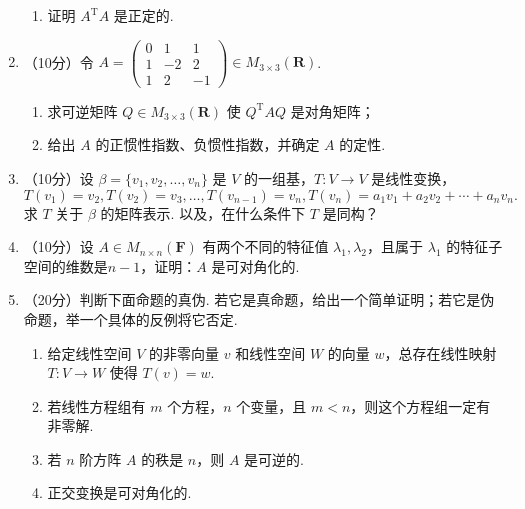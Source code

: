 \begin{enumerate}
\begin{enumerate}
        \item 证明 $A^{\mathrm{T}}A$ 是正定的.
    \end{enumerate}

    \item （10分）令 $A = \begin{pmatrix}0 & 1 & 1 \\ 1 & -2 & 2 \\ 1 & 2 & -1 \end{pmatrix} \in M_{3\times 3}(\mathbf R)$.
    \begin{enumerate}
        \item 求可逆矩阵 $Q\in M_{3\times 3}(\mathbf R)$ 使 $Q^{\mathrm{T}}AQ$ 是对角矩阵；

        \item 给出 $A$ 的正惯性指数、负惯性指数，并确定 $A$ 的定性.
    \end{enumerate}

    \item （10分）设 $\beta=\{v_1,v_2,\ldots,v_n\}$ 是 $V$ 的一组基，$T\colon V\to V$ 是线性变换，
    \[ T(v_1)=v_2,T(v_2)=v_3,\ldots,T(v_{n-1})=v_n,T(v_n)=a_1v_1+a_2v_2+\cdots+a_nv_n.\]
    求 $T$ 关于 $\beta$ 的矩阵表示. 以及，在什么条件下 $T$ 是同构？

    \item （10分）设 $A\in M_{n\times n}(\mathbf{F})$ 有两个不同的特征值 $\lambda_1,\lambda_2$，且属于 $\lambda_1$ 的特征子空间的维数是$n-1$，证明：$A$ 是可对角化的.

    \item （20分）判断下面命题的真伪. 若它是真命题，给出一个简单证明；若它是伪命题，举一个具体的反例将它否定.
    \begin{enumerate}
        \item 给定线性空间 $V$ 的非零向量 $v$ 和线性空间 $W$ 的向量 $w$，总存在线性映射 $T\colon V\to W$ 使得 $T(v)=w$.

        \item 若线性方程组有 $m$ 个方程，$n$ 个变量，且 $m < n$，则这个方程组一定有非零解.

        \item 若 $n$ 阶方阵 $A$ 的秩是 $n$，则 $A$ 是可逆的.

        \item 正交变换是可对角化的.
    \end{enumerate}
\end{enumerate}

\clearpage
